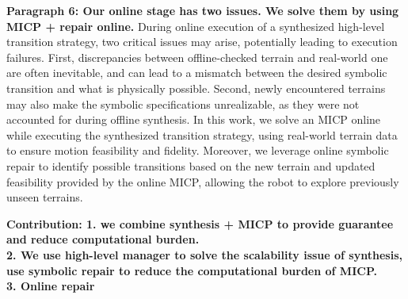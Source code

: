 \documentclass[letterpaper, 10 pt, conference]{ieeeconf}
\begin{document}
\textbf{Paragraph 6: Our online stage has two issues. We solve them by using MICP + repair online.}
During online execution of a synthesized high-level transition strategy, two critical issues may arise, potentially leading to execution failures. First, discrepancies between offline-checked terrain and real-world one are often inevitable, and can lead to a mismatch between the desired symbolic transition and what is physically possible. Second, newly encountered terrains may also make the symbolic specifications unrealizable, as they were not accounted for during offline synthesis. %
In this work, we solve an MICP online while executing the synthesized transition strategy, using real-world terrain data to ensure motion feasibility and fidelity. 
Moreover, 
we leverage online symbolic repair to
identify possible transitions based on the new terrain and updated feasibility provided by the online MICP, allowing the robot to explore previously unseen terrains.

\textbf{Contribution:
1. we combine synthesis + MICP to provide guarantee and reduce computational burden.\\
2. We use high-level manager to solve the scalability issue of synthesis,
use symbolic repair to reduce the computational burden of MICP.\\
3. Online repair }
\end{document}
